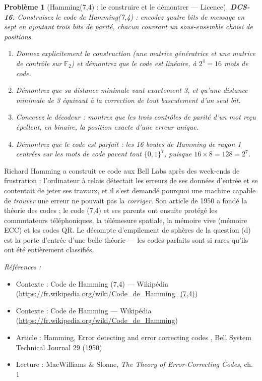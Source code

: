 \documentclass[11pt]{article}
\newtheorem{problem}{Problème}
\newenvironment{refs}{\par\small\noindent\emph{Références :}\begin{itemize}\setlength\itemsep{0pt}}{\end{itemize}\normalsize}
\begin{document}
\begin{problem}[{Hamming(7,4) : le construire et le démontrer --- Licence}]
\textbf{DCS-16.} Construisez le code de Hamming(7,4) : encodez quatre bits de message en sept en ajoutant trois bits de parité, chacun couvrant un sous-ensemble choisi de positions.
\begin{enumerate}
\item[(a)] Donnez explicitement la construction (une matrice génératrice et une matrice de contrôle sur $\mathbb{F}_2$) et démontrez que le code est linéaire, à $2^4 = 16$ mots de code.
\item[(b)] Démontrez que sa distance minimale vaut exactement 3, et qu'une distance minimale de 3 équivaut à la correction de tout basculement d'un seul bit.
\item[(c)] Concevez le décodeur : montrez que les trois contrôles de parité d'un mot reçu épellent, en binaire, la position exacte d'une erreur unique.
\item[(d)] Démontrez que le code est \textit{parfait} : les 16 boules de Hamming de rayon 1 centrées sur les mots de code pavent tout $\{0,1\}^7$, puisque $16 \times 8 = 128 = 2^7$.
\end{enumerate}

\end{problem}

\noindent Richard Hamming a construit ce code aux Bell Labs après des week-ends de frustration : l'ordinateur à relais détectait les erreurs de ses données d'entrée et se contentait de jeter ses travaux, et il s'est demandé pourquoi une machine capable de \textit{trouver} une erreur ne pouvait pas la \textit{corriger}. Son article de 1950 a fondé la théorie des codes ; le code (7,4) et ses parents ont ensuite protégé les commutateurs téléphoniques, la télémesure spatiale, la mémoire vive (mémoire ECC) et les codes QR. Le décompte d'empilement de sphères de la question (d) est la porte d'entrée d'une belle théorie --- les codes parfaits sont si rares qu'ils ont été entièrement classifiés.

\begin{refs}
\item Contexte : Code de Hamming (7,4) --- Wikipédia (\url{https://fr.wikipedia.org/wiki/Code_de_Hamming_(7,4)})
\item Contexte : Code de Hamming --- Wikipédia (\url{https://fr.wikipedia.org/wiki/Code_de_Hamming})
\item Article : Hamming, \og{} Error detecting and error correcting codes \fg{}, Bell System Technical Journal 29 (1950)
\item Lecture : MacWilliams \& Sloane, \textit{The Theory of Error-Correcting Codes}, ch. 1
\end{refs}
\end{document}
